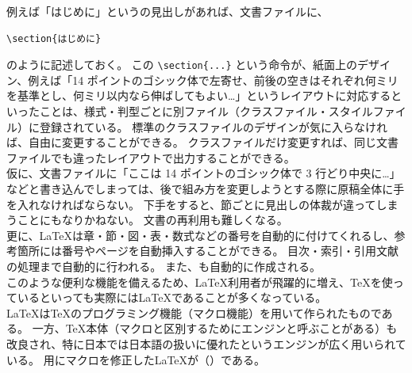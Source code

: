 例えば「はじめに」というの見出しがあれば、文書ファイルに、
\begin{mdframed}[roundcorner=0.50zw,leftmargin=3.00zw,rightmargin=3.00zw,skipabove=0.40zw,skipbelow=0.40zw,innertopmargin=4.00pt,innerbottommargin=4.00pt,innerleftmargin=5.00pt,innerrightmargin=5.00pt,linecolor=gray!020,linewidth=0.50pt,backgroundcolor=gray!20]
\begin{verbatim}
\section{はじめに}
\end{verbatim}
\end{mdframed}
のように記述しておく。
この \verb'\section{...}' という命令が、紙面上のデザイン、例えば「14 ポイントのゴシック体で左寄せ、前後の空きはそれぞれ何ミリを基準とし、何ミリ以内なら伸ばしてもよい…」というレイアウトに対応するといったことは、様式・判型ごとに別ファイル（クラスファイル・スタイルファイル）に登録されている。
標準のクラスファイルのデザインが気に入らなければ、自由に変更することができる。
クラスファイルだけ変更すれば、同じ文書ファイルでも違ったレイアウトで出力することができる。\\

仮に、文書ファイルに「ここは 14 ポイントのゴシック体で 3 行どり中央に…」などと書き込んでしまっては、後で組み方を変更しようとする際に原稿全体に手を入れなければならない。
下手をすると、節ごとに見出しの体裁が違ってしまうことにもなりかねない。
文書の再利用も難しくなる。\\

更に、\LaTeX{}は章・節・図・表・数式などの番号を自動的に付けてくれるし、参考箇所には番号やページを自動挿入することができる。
目次・索引・引用文献の処理まで自動的に行われる。
また、も自動的に作成される。\\

このような便利な機能を備えるため、\LaTeX{}利用者が飛躍的に増え、\TeX{}を使っているといっても実際には\LaTeX{}であることが多くなっている。\\

\LaTeX{}は\TeX{}のプログラミング機能（マクロ機能）を用いて作られたものである。
一方、\TeX{}本体（マクロと区別するためにエンジンと呼ぶことがある）も改良され、特に日本では日本語の扱いに優れた\pTeX{}というエンジンが広く用いられている。
\pTeX{}用にマクロを修正した\LaTeX{}が\pLaTeX（\pLaTeXe）である。\\

